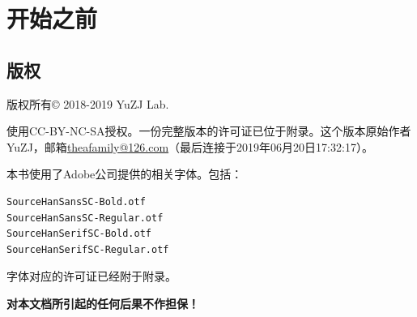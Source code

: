 \part{开始之前}
\chapter{版权}
版权所有\copyright{} 2018-2019 YuZJ Lab. \par
使用CC-BY-NC-SA授权。一份完整版本的许可证已位于附录。这个版本原始作者YuZJ，邮箱\url{theafamily@126.com}（最后连接于2019年06月20日17:32:17）。\par
本书使用了Adobe公司提供的相关字体。包括：
\begin{verbatim}
SourceHanSansSC-Bold.otf
SourceHanSansSC-Regular.otf
SourceHanSerifSC-Bold.otf
SourceHanSerifSC-Regular.otf
\end{verbatim}
字体对应的许可证已经附于附录。
\begin{center}
{\large \bf\color{red}对本文档所引起的任何后果不作担保！}
\end{center}
